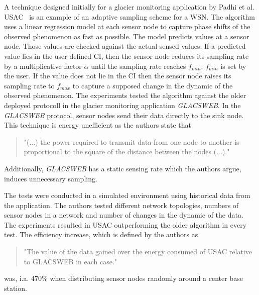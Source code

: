 A technique designed initially for a glacier monitoring application by Padhi et
al. \ac{USAC}~\cite{padhy2006utility} is an example of an adaptive sampling
scheme for a \ac{WSN}. The algorithm uses a linear regression model at each
sensor node to capture phase shifts of the observed phenomenon as fast as
possible. The model predicts values at a sensor node. Those values are checked
against the actual sensed values. If a predicted value lies in the user defined
\ac{CI}, then the sensor node reduces its sampling rate by a multiplicative
factor $ \alpha $ until the sampling rate reaches $ f_{min} $. $ f_{min} $ is
set by the user. If the value does not lie in the \ac{CI} then the sensor node
raises its sampling rate to $ f_{max} $ to capture a supposed change in the
dynamic of the observed phenomenon. The experiments tested the algorithm
against the older deployed protocoll in the glacier monitoring application
\textit{GLACSWEB}. In the \textit{GLACSWEB} protocol, sensor nodes send their
data directly to the sink node. This technique is energy unefficient as the
authors state that 

\begin{quotation}
    "(...) the power required to transmit data from one
    node to another is proportional to the square of the distance
    between the nodes (...)."
\end{quotation}

Additionally, \textit{GLACSWEB} has a static sensing rate which the authors
argue, induces unnecessary sampling.

The tests were conducted in a simulated environment using
historical data from the application. The authors tested different network
topologies, numbers of sensor nodes in a network and number of changes in the
dynamic of the data. The experiments resulted in \ac{USAC} outperforming the
older algorithm in every test. The efficiency increase, which is defined by the
authors as

\begin{quotation}
    "The value of the data gained over the energy consumed of USAC relative to
    GLACSWEB in each case."
\end{quotation}


was, i.a. 470\% when distributing sensor nodes randomly around a center base
station.
\par

